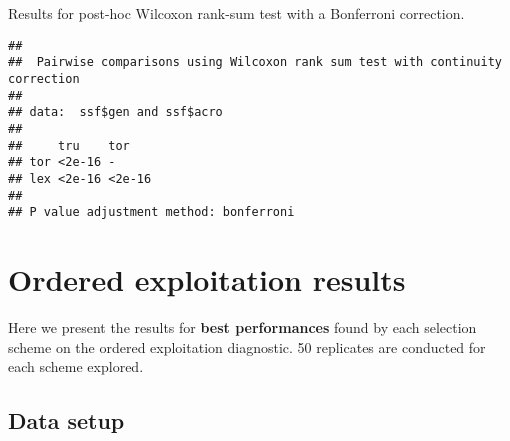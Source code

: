 \documentclass[]{book}
\newenvironment{Shaded}{\begin{snugshade}}{\end{snugshade}}
\newcommand{\DataTypeTok}[1]{\textcolor[rgb]{0.13,0.29,0.53}{#1}}
\newcommand{\KeywordTok}[1]{\textcolor[rgb]{0.13,0.29,0.53}{\textbf{#1}}}
\newcommand{\NormalTok}[1]{#1}
\newcommand{\OperatorTok}[1]{\textcolor[rgb]{0.81,0.36,0.00}{\textbf{#1}}}
\newcommand{\OtherTok}[1]{\textcolor[rgb]{0.56,0.35,0.01}{#1}}
\newcommand{\StringTok}[1]{\textcolor[rgb]{0.31,0.60,0.02}{#1}}
\begin{document}
Results for post-hoc Wilcoxon rank-sum test with a Bonferroni correction.

\begin{Shaded}
\end{Shaded}

\begin{verbatim}
## 
##  Pairwise comparisons using Wilcoxon rank sum test with continuity correction 
## 
## data:  ssf$gen and ssf$acro 
## 
##     tru    tor   
## tor <2e-16 -     
## lex <2e-16 <2e-16
## 
## P value adjustment method: bonferroni
\end{verbatim}

\hypertarget{ordered-exploitation-results}{%
\chapter{Ordered exploitation results}\label{ordered-exploitation-results}}

Here we present the results for \textbf{best performances} found by each selection scheme on the ordered exploitation diagnostic.
50 replicates are conducted for each scheme explored.

\hypertarget{data-setup-1}{%
\section{Data setup}\label{data-setup-1}}
\end{document}

